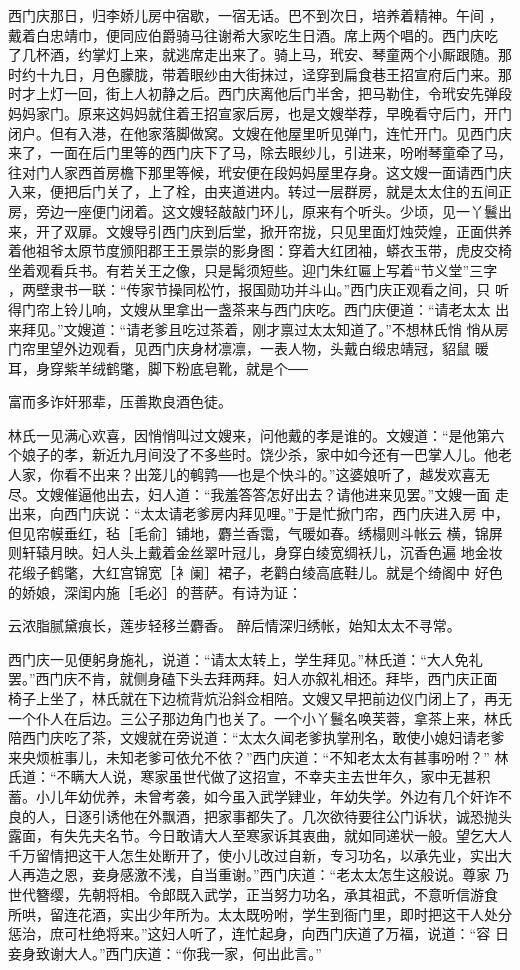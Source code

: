 西门庆那日，归李娇儿房中宿歇，一宿无话。巴不到次日，培养着精神。午间
，戴着白忠靖巾，便同应伯爵骑马往谢希大家吃生日酒。席上两个唱的。西门庆吃
了几杯酒，约掌灯上来，就逃席走出来了。骑上马，玳安、琴童两个小厮跟随。那
时约十九日，月色朦胧，带着眼纱由大街抹过，迳穿到扁食巷王招宣府后门来。那
时才上灯一回，街上人初静之后。西门庆离他后门半舍，把马勒住，令玳安先弹段
妈妈家门。原来这妈妈就住着王招宣家后房，也是文嫂举荐，早晚看守后门，开门
闭户。但有入港，在他家落脚做窝。文嫂在他屋里听见弹门，连忙开门。见西门庆
来了，一面在后门里等的西门庆下了马，除去眼纱儿，引进来，吩咐琴童牵了马，
往对门人家西首房檐下那里等候，玳安便在段妈妈屋里存身。这文嫂一面请西门庆
入来，便把后门关了，上了栓，由夹道进内。转过一层群房，就是太太住的五间正
房，旁边一座便门闭着。这文嫂轻敲敲门环儿，原来有个听头。少顷，见一丫鬟出
来，开了双扉。文嫂导引西门庆到后堂，掀开帘拢，只见里面灯烛荧煌，正面供养
着他祖爷太原节度颁阳郡王王景崇的影身图：穿着大红团袖，蟒衣玉带，虎皮交椅
坐着观看兵书。有若关王之像，只是髯须短些。迎门朱红匾上写着“节义堂”三字
，两壁隶书一联：“传家节操同松竹，报国勋功并斗山。”西门庆正观看之间，只
听得门帘上铃儿响，文嫂从里拿出一盏茶来与西门庆吃。西门庆便道：“请老太太
出来拜见。”文嫂道：“请老爹且吃过茶着，刚才禀过太太知道了。”不想林氏悄
悄从房门帘里望外边观看，见西门庆身材凛凛，一表人物，头戴白缎忠靖冠，貂鼠
暖耳，身穿紫羊绒鹤氅，脚下粉底皂靴，就是个──

富而多诈奸邪辈，压善欺良酒色徒。

林氏一见满心欢喜，因悄悄叫过文嫂来，问他戴的孝是谁的。文嫂道：“是他第六
个娘子的孝，新近九月间没了不多些时。饶少杀，家中如今还有一巴掌人儿。他老
人家，你看不出来？出笼儿的鹌鹑──也是个快斗的。”这婆娘听了，越发欢喜无
尽。文嫂催逼他出去，妇人道：“我羞答答怎好出去？请他进来见罢。”文嫂一面
走出来，向西门庆说：“太太请老爹房内拜见哩。”于是忙掀门帘，西门庆进入房
中，但见帘幙垂红，毡［毛俞］铺地，麝兰香霭，气暖如春。绣榻则斗帐云
横，锦屏则轩辕月映。妇人头上戴着金丝翠叶冠儿，身穿白绫宽绸袄儿，沉香色遍
地金妆花缎子鹤氅，大红宫锦宽［衤阑］裙子，老鹳白绫高底鞋儿。就是个绮阁中
好色的娇娘，深闺内施［毛必］的菩萨。有诗为证：

云浓脂腻黛痕长，莲步轻移兰麝香。
醉后情深归绣帐，始知太太不寻常。

西门庆一见便躬身施礼，说道：“请太太转上，学生拜见。”林氏道：“大人免礼
罢。”西门庆不肯，就侧身磕下头去拜两拜。妇人亦叙礼相还。拜毕，西门庆正面
椅子上坐了，林氏就在下边梳背炕沿斜佥相陪。文嫂又早把前边仪门闭上了，再无
一个仆人在后边。三公子那边角门也关了。一个小丫鬟名唤芙蓉，拿茶上来，林氏
陪西门庆吃了茶，文嫂就在旁说道：“太太久闻老爹执掌刑名，敢使小媳妇请老爹
来央烦桩事儿，未知老爹可依允不依？”西门庆道：“不知老太太有甚事吩咐？”
林氏道：“不瞒大人说，寒家虽世代做了这招宣，不幸夫主去世年久，家中无甚积
蓄。小儿年幼优养，未曾考袭，如今虽入武学肄业，年幼失学。外边有几个奸诈不
良的人，日逐引诱他在外飘酒，把家事都失了。几次欲待要往公门诉状，诚恐抛头
露面，有失先夫名节。今日敢请大人至寒家诉其衷曲，就如同递状一般。望乞大人
千万留情把这干人怎生处断开了，使小儿改过自新，专习功名，以承先业，实出大
人再造之恩，妾身感激不浅，自当重谢。”西门庆道：“老太太怎生这般说。尊家
乃世代簪缨，先朝将相。令郎既入武学，正当努力功名，承其祖武，不意听信游食
所哄，留连花酒，实出少年所为。太太既吩咐，学生到衙门里，即时把这干人处分
惩治，庶可杜绝将来。”这妇人听了，连忙起身，向西门庆道了万福，说道：“容
日妾身致谢大人。”西门庆道：“你我一家，何出此言。”

